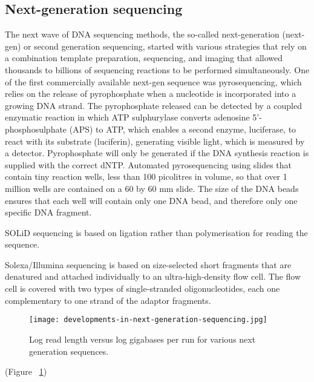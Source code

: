 \subsection{Next-generation sequencing}

The next wave of DNA sequencing methods, the so-called next-generation (next-gen) or second generation sequencing, started with various strategies that rely on a combination template preparation, sequencing, and imaging that allowed thousands to billions of sequencing reactions to be performed simultaneously\cite{pmid19997069}. One of the first commercially available next-gen sequence was pyrosequencing, which relies on the release of pyrophosphate when a nucleotide is incorporated into a growing DNA strand. The pyrophosphate released can be detected by a coupled enzymatic reaction in which ATP sulphurylase converts adenosine 5'-phosphosulphate (APS) to ATP, which enables a second enzyme, luciferase, to react with its substrate (luciferin), generating visible light, which is measured by a detector. Pyrophosphate will only be generated if the DNA synthesis reaction is supplied with the correct dNTP. Automated pyrosequencing using slides that contain tiny reaction wells, less than 100 picolitres in volume, so that over 1 million wells are contained on a 60 by 60 mm slide. The size of the DNA beads ensures that each well will contain only one DNA bead, and therefore only one specific DNA fragment.

SOLiD sequencing is based on ligation rather than polymerisation for reading the sequence.

Solexa/Illumina sequencing is based on size-selected short fragments that are denatured and attached individually to an ultra-high-density flow cell. The flow cell is covered with two types of single-stranded oligonucleotides, each one complementary to one strand of the adaptor fragments.


\begin{figure}[h]
   \centering
   \texttt{[image: developments-in-next-generation-sequencing.jpg]}
   \caption[Developments in next generation sequencing]{Log read length versus log gigabases per run for various next generation sequences\cite{Nederbragt2012}.}
   \label{fig:dev_next_gen}
\end{figure}

(Figure ~\ref{fig:dev_next_gen})

